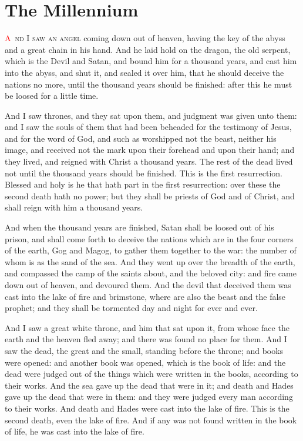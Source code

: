 
\chapter{The Millennium}
\lettrine[lines=3,slope=-0.5em]{\textcolor{red}{A}}{\ nd I saw an angel} coming down out of heaven, having the key of the abyss and a great chain in his hand. 
 And he laid hold on the dragon, the old serpent, which is the Devil and Satan, and bound him for a thousand years, 
 and cast him into the abyss, and shut it, and sealed it over him, that he should deceive the nations no more, until the thousand years should be finished: after this he must be loosed for a little time.

 And I saw thrones, and they sat upon them, and judgment was given unto them: and I saw the souls of them that had been beheaded for the testimony of Jesus, and for the word of God, and such as worshipped not the beast, neither his image, and received not the mark upon their forehead and upon their hand; and they lived, and reigned with Christ a thousand years. 
 The rest of the dead lived not until the thousand years should be finished. This is the first resurrection. 
 Blessed and holy is he that hath part in the first resurrection: over these the second death hath no power; but they shall be priests of God and of Christ, and shall reign with him a thousand years.

 And when the thousand years are finished, Satan shall be loosed out of his prison, 
 and shall come forth to deceive the nations which are in the four corners of the earth, Gog and Magog, to gather them together to the war: the number of whom is as the sand of the sea. 
 And they went up over the breadth of the earth, and compassed the camp of the saints about, and the beloved city: and fire came down out of heaven, and devoured them. 
 And the devil that deceived them was cast into the lake of fire and brimstone, where are also the beast and the false prophet; and they shall be tormented day and night for ever and ever.

 And I saw a great white throne, and him that sat upon it, from whose face the earth and the heaven fled away; and there was found no place for them. 
 And I saw the dead, the great and the small, standing before the throne; and books were opened: and another book was opened, which is the book of life: and the dead were judged out of the things which were written in the books, according to their works. 
 And the sea gave up the dead that were in it; and death and Hades gave up the dead that were in them: and they were judged every man according to their works. 
 And death and Hades were cast into the lake of fire. This is the second death, even the lake of fire. 
 And if any was not found written in the book of life, he was cast into the lake of fire.